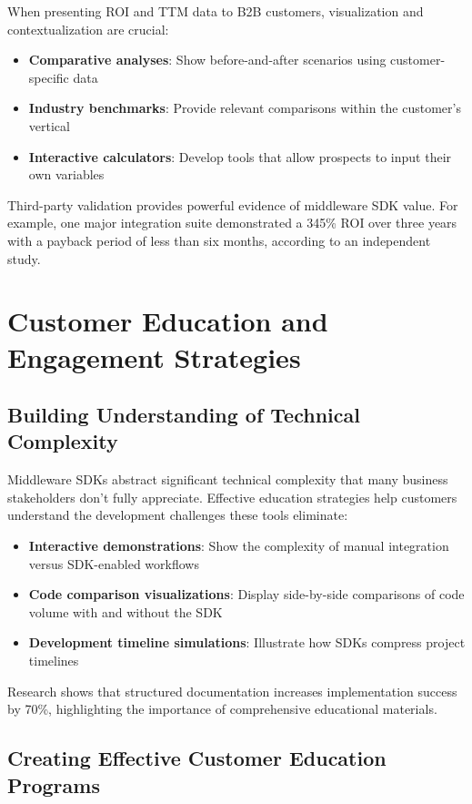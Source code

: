 \documentclass[11pt,a4paper]{article}
\begin{document}
When presenting ROI and TTM data to B2B customers, visualization and contextualization are crucial:

\begin{itemize}
    \item \textbf{Comparative analyses}: Show before-and-after scenarios using customer-specific data
    \item \textbf{Industry benchmarks}: Provide relevant comparisons within the customer's vertical
    \item \textbf{Interactive calculators}: Develop tools that allow prospects to input their own variables
\end{itemize}

Third-party validation provides powerful evidence of middleware SDK value. For example, one major integration suite demonstrated a 345\% ROI over three years with a payback period of less than six months, according to an independent study.

\section{Customer Education and Engagement Strategies}

\subsection{Building Understanding of Technical Complexity}

Middleware SDKs abstract significant technical complexity that many business stakeholders don't fully appreciate. Effective education strategies help customers understand the development challenges these tools eliminate:

\begin{itemize}
    \item \textbf{Interactive demonstrations}: Show the complexity of manual integration versus SDK-enabled workflows
    \item \textbf{Code comparison visualizations}: Display side-by-side comparisons of code volume with and without the SDK
    \item \textbf{Development timeline simulations}: Illustrate how SDKs compress project timelines
\end{itemize}

Research shows that structured documentation increases implementation success by 70\%, highlighting the importance of comprehensive educational materials.

\subsection{Creating Effective Customer Education Programs}
\end{document}
